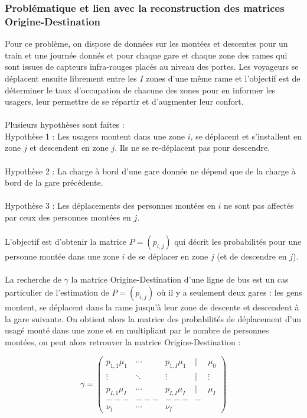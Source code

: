 \documentclass[12pt]{article}
\begin{document}
\subsubsection{Problématique et lien avec la reconstruction des matrices Origine-Destination}
Pour ce problème, on dispose de données sur les montées et descentes pour un train et une journée donnés et pour chaque gare et chaque zone des rames qui sont issues de capteurs infra-rouges placés au niveau des portes. Les voyageurs se déplacent ensuite librement entre les $I$ zones d'une même rame et l'objectif est de déterminer le taux d'occupation de chacune des zones pour en informer les usagers,  leur permettre de se répartir et d'augmenter leur confort.\\
\\
Plusieurs hypothèses sont faites :\\
Hypothèse 1 : Les usagers montent dans une zone $i$, se déplacent et s'installent en zone $j$ et descendent en zone $j$. Ils ne se re-déplacent pas pour descendre.\\
\\
Hypothèse 2 : La charge à bord d'une gare donnée ne dépend que de la charge à bord de la gare précédente.\\
\\
Hypothèse 3 : Les déplacements des personnes montées en $i$ ne sont pas affectés par ceux des personnes montées en $j$.\\
\\
L'objectif est d'obtenir la matrice $P = (p_{i,j})$ qui décrit les probabilités pour une personne montée dans une zone $i$ de se déplacer en zone $j$ (et de descendre en $j$).\\
\\
La recherche de $\gamma$ la matrice Origine-Destination d'une ligne de bus est un cas particulier de l'estimation de $P = (p_{i,j})$ où il y a seulement deux gares : les gens montent, se déplacent dans la rame jusqu'à leur zone de descente et descendent à la gare suivante. On obtient alors la matrice des probabilités de déplacement d'un usagé monté dans une zone et en multipliant par le nombre de personnes montées, on peut alors retrouver la matrice Origine-Destination :
\begin{adjustwidth}{-2cm}{-2cm}
\[\gamma = 
\begin{pmatrix}
p_{1,1}\mu_1 & \cdots & p_{1,I}\mu_1 & | & \mu_0 \\
\vdots & \ddots & \vdots  & | &\vdots \\
 p_{I,1}\mu_I & \cdots & p_{I,I}\mu_I &| &\mu_I\\
--- & ---& ---&-\\
\nu_1 & \cdots & \nu_I
\end{pmatrix}\]
\end{adjustwidth}
\end{document}

